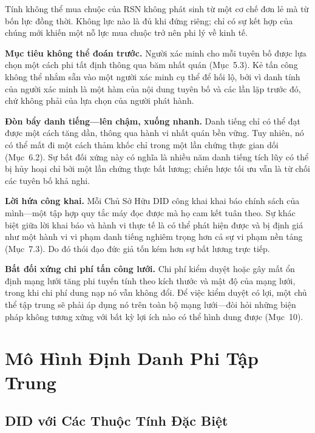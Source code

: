 \documentclass[11pt,a4paper,twocolumn]{article}
\begin{document}
Tính không thể mua chuộc của RSN không phát sinh từ một cơ chế đơn lẻ mà từ bốn lực đồng thời. Không lực nào là đủ khi đứng riêng; chỉ có sự kết hợp của chúng mới khiến một nỗ lực mua chuộc trở nên phi lý về kinh tế.

\textbf{Mục tiêu không thể đoán trước.} Người xác minh cho mỗi tuyên bố được lựa chọn một cách phi tất định thông qua băm nhất quán (Mục~5.3). Kẻ tấn công không thể nhắm sẵn vào một người xác minh cụ thể để hối lộ, bởi vì danh tính của người xác minh là một hàm của nội dung tuyên bố và các lần lặp trước đó, chứ không phải của lựa chọn của người phát hành.

\textbf{Đòn bẩy danh tiếng---lên chậm, xuống nhanh.} Danh tiếng chỉ có thể đạt được một cách tăng dần, thông qua hành vi nhất quán bền vững. Tuy nhiên, nó có thể mất đi một cách thảm khốc chỉ trong một lần chứng thực gian dối (Mục~6.2). Sự bất đối xứng này có nghĩa là nhiều năm danh tiếng tích lũy có thể bị hủy hoại chỉ bởi một lần chứng thực bất lương; chiến lược tối ưu vẫn là từ chối các tuyên bố khả nghi.

\textbf{Lời hứa công khai.} Mỗi Chủ Sở Hữu DID công khai khai báo chính sách của mình---một tập hợp quy tắc máy đọc được mà họ cam kết tuân theo. Sự khác biệt giữa lời khai báo và hành vi thực tế là có thể phát hiện được và bị định giá như một hành vi vi phạm danh tiếng nghiêm trọng hơn cả sự vi phạm nền tảng (Mục~7.3). Do đó thói đạo đức giả tốn kém hơn sự bất lương trực tiếp.

\textbf{Bất đối xứng chi phí tấn công lưới.} Chi phí kiểm duyệt hoặc gây mất ổn định mạng lưới tăng phi tuyến tính theo kích thước và mật độ của mạng lưới, trong khi chi phí dung nạp nó vẫn không đổi. Để việc kiểm duyệt có lợi, một chủ thể tập trung sẽ phải áp dụng nó trên toàn bộ mạng lưới---đòi hỏi những biện pháp không tương xứng với bất kỳ lợi ích nào có thể hình dung được (Mục~10).

\section{Mô Hình Định Danh Phi Tập Trung}

\subsection{DID với Các Thuộc Tính Đặc Biệt}
\end{document}
